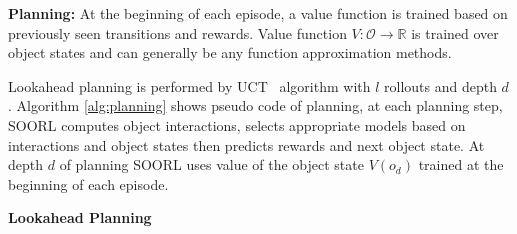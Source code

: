 \textbf{Planning:} At the beginning of each episode, a value function is trained based on previously seen transitions and rewards. Value function $V: \mathcal{O} \rightarrow \mathbb{R}$ is trained over object states and can generally be any function approximation methods.

Lookahead planning is performed by UCT~\citep{kocsis2006bandit} algorithm with $l$ rollouts and depth $d$. Algorithm \ref{alg:planning} shows pseudo code of planning, at each planning step, SOORL computes object interactions, selects appropriate models based on interactions and object states then predicts rewards and next object state. At depth $d$ of planning SOORL uses value of the object state $V(o_d)$ trained at the beginning of each episode.

\begin{algorithm}[h]
\caption{{\bf Lookahead Planning} \label{alg:planning}}
\end{algorithm}
